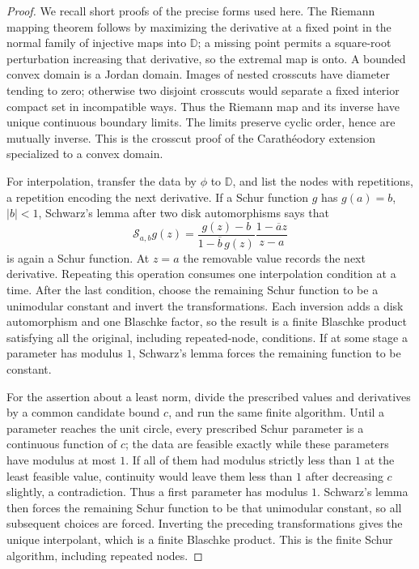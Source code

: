 \documentclass[11pt]{article}
\theoremstyle{definition}
\theoremstyle{remark}
\newcommand{\D}{\mathbb D}
\begin{document}
\begin{proof}
We recall short proofs of the precise forms used here.  The Riemann mapping
theorem follows by maximizing the derivative at a fixed point in the normal
family of injective maps into \(\D\); a missing point permits a square-root
perturbation increasing that derivative, so the extremal map is onto.  A
bounded convex domain is a Jordan domain.  Images of nested crosscuts have
diameter tending to zero; otherwise two disjoint crosscuts would separate a
fixed interior compact set in incompatible ways.  Thus the Riemann map and
its inverse have unique continuous boundary limits.  The limits preserve
cyclic order, hence are mutually inverse.  This is the crosscut proof of the
Carath\'eodory extension specialized to a convex domain.

For interpolation, transfer the data by \(\phi\) to \(\D\), and list the nodes
with repetitions, a repetition encoding the next derivative.  If a Schur
function \(g\) has \(g(a)=b\), \(|b|<1\), Schwarz's lemma after two disk
automorphisms says that
\[
 \mathcal S_{a,b}g(z)=
 \frac{g(z)-b}{1-\overline b\,g(z)}
 \frac{1-\overline a z}{z-a}
\]
is again a Schur function.  At \(z=a\) the removable value records the next
derivative.  Repeating this operation consumes one interpolation condition at
a time.  After the last condition, choose the remaining Schur function to be
a unimodular constant and invert the transformations.  Each inversion adds a
disk automorphism and one Blaschke factor, so the result is a finite Blaschke
product satisfying all the original, including repeated-node, conditions.
If at some stage a parameter has modulus \(1\), Schwarz's lemma forces the
remaining function to be constant.

For the assertion about a least norm, divide the prescribed values and
derivatives by a common candidate bound \(c\), and run the same finite
algorithm.  Until a parameter reaches the unit circle, every prescribed
Schur parameter is a continuous function of \(c\); the data are feasible
exactly while these parameters have modulus at most \(1\).  If all of them
had modulus strictly less than \(1\) at the least feasible value, continuity
would leave them less than \(1\) after decreasing \(c\) slightly, a
contradiction.  Thus a first parameter has modulus \(1\).  Schwarz's lemma
then forces the remaining Schur function to be that unimodular constant, so
all subsequent choices are forced.  Inverting the preceding transformations
gives the unique interpolant, which is a finite Blaschke product.  This is
the finite Schur algorithm, including repeated nodes.
\end{proof}
\end{document}
